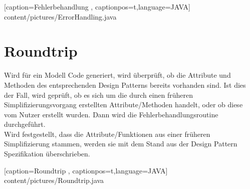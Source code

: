 
    [caption={Fehlerbehandlung}
       \label{lst:javaclass},
       captionpos=t,language=JAVA]
 {content/pictures/ErrorHandling.java} 

\section{Roundtrip}

Wird für ein Modell Code generiert, wird überprüft, ob die Attribute und Methoden des entsprechenden Design Patterns bereits vorhanden sind. Ist dies der Fall, wird geprüft, ob es sich um die durch einen früheren Simplifizierungsvorgang erstellten Attribute/Methoden handelt, oder ob diese vom Nutzer erstellt wurden. Dann wird die Fehlerbehandlungsroutine durchgeführt. \\
Wird festgestellt, dass die Attribute/Funktionen aus einer früheren Simplifizierung stammen, werden sie mit dem Stand aus der Design Pattern Spezifikation überschrieben.


    [caption={Roundtrip}
       \label{lst:javaclass},
       captionpos=t,language=JAVA]
 {content/pictures/Roundtrip.java} 